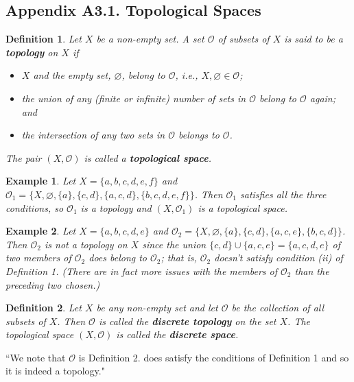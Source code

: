 \documentclass[12pt,reqno]{amsart}
\theoremstyle{plain}
\newtheorem{defi}{Definition}
\newtheorem{ex}{Example}
\begin{document}
\subsection{Appendix A3.1. Topological Spaces}
\begin{defi} Let $X$ be a non-empty set. A set $\mathcal{O}$ of subsets of $X$ is said to be a \textup{\textbf{topology}} on $X$ if 
\begin{itemize}
	\item [\textup{(i)}] $X$ and the empty set, $\varnothing$, belong to $\mathcal{O}$, i.e., $X,\varnothing \in \mathcal{O}$; 
	\item [\textup{(ii)}] the union of any (finite or infinite) number of sets in $\mathcal{O}$ belong to $\mathcal{O}$ again; and
	\item [\textup{(iii)}] the intersection of any two sets in $\mathcal{O}$ belongs to $\mathcal{O}$.
\end{itemize}
The pair $(X, \mathcal{O})$ is called a \textup{\textbf{topological space}}. 
\end{defi}
\begin{ex} Let $X = \{a, b, c, d, e, f \}$ and $\mathcal{O}_1 = \{ X, \varnothing, \{a \}, \{c,d \}, \{a, c, d \}, \{b, c, d, e, f \} \}$. Then $\mathcal{O}_1$ satisfies all the three conditions, so $\mathcal{O}_1$ is a topology and $(X, \mathcal{O}_1)$ is a topological space. 
\end{ex}

\begin{ex} Let $X = \{a, b, c, d, e \}$ and $\mathcal{O}_2 = \{ X, \varnothing, \{a \}, \{c, d \}, \{a, c, e \}, \{b, c, d \} \}$. Then $\mathcal{O}_2$ is not a topology on $X$ since the union $\{c, d \} \cup \{a, c, e \} = \{a, c, d, e \}$ of two members of $\mathcal{O}_2$ does belong to $\mathcal{O}_2$; that is, $\mathcal{O}_2$ doesn't satisfy condition \textup{(ii)} of Definition 1. (There are in fact more issues with the members of $\mathcal{O}_2$ than the preceding two chosen.)
\end{ex} 
\begin{defi} Let $X$ be any non-empty set and let $\mathcal{O}$ be the collection of all subsets of $X$.  Then $\mathcal{O}$ is called the \textup{\textbf{discrete topology}} on the set $X$. The topological space $(X, \mathcal{O})$ is called the \textup{\textbf{discrete space}}. 
\end{defi} 

``We note that $\mathcal{O}$ is Definition 2. does satisfy the conditions of Definition 1 and so it is indeed a topology."
\end{document}
